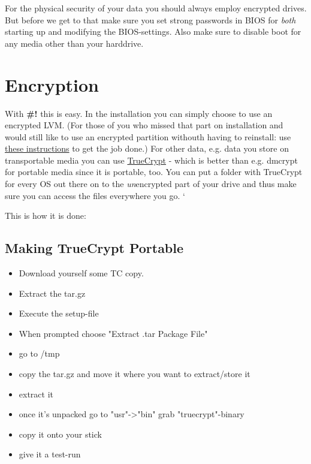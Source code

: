 \documentclass{article}
\begin{document}
 For the physical security of your data you should always employ encrypted drives. But before we get to that make sure you set strong passwords in BIOS for \emph{both} starting up and modifying the BIOS-settings. Also make sure to disable boot for any media other than your harddrive.
\section{Encryption}


 With
\textbf{\#!} this is easy. In the installation you can simply choose to use an encrypted LVM. (For those of you who missed that part on installation and would still like to use an encrypted partition withouth having to reinstall: use \href{http://www.debian-administration.org/article/How_to_set_up_an_encrypted_filesystem_in_several_easy_steps}{these instructions} to get the job done.) For other data, e.g. data you store on transportable media you can use \href{http://www.truecrypt.org/}{TrueCrypt} - which is better than e.g. dmcrypt for portable media since it is portable, too. You can put a folder with TrueCrypt for every OS out there on to the \emph{un}encrypted part of your drive and thus make sure you can access the files everywhere you go. `


 This is how it is done:
\subsection{Making TrueCrypt Portable}\begin{itemize}\item 


 Download yourself some TC copy.\item 


 Extract the tar.gz\item 


 Execute the setup-file\item 


 When prompted choose "Extract .tar Package File"\item 


 go to /tmp\item 


 copy the tar.gz and move it where you want to extract/store it\item 


 extract it\item 


 once it's unpacked go to "usr"->"bin" grab "truecrypt"-binary\item 


 copy it onto your stick\item 


 give it a test-run\end{itemize}
\end{document}
